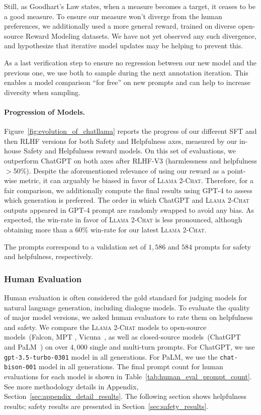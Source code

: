 Still, as Goodhart's Law states, when a measure becomes a target, it ceases to be a good measure. To ensure our measure won't diverge from the human preferences, we additionally used a more general reward, trained on diverse open-source Reward Modeling datasets. We have not yet observed any such divergence, and hypothesize that iterative model updates may be helping to prevent this. 

As a last verification step to ensure no regression between our new model and the previous one, we use both to sample during the next annotation iteration. This enables a model comparison ``for free'' on new prompts and can help to increase diversity when sampling.

\paragraph{Progression of Models.} Figure~\ref{fig:evolution_of_chatllama} reports the progress of our different SFT and then RLHF versions for both Safety and Helpfulness axes, measured by our in-house Safety and Helpfulness reward models. On this set of evaluations, we outperform ChatGPT on both axes after RLHF-V3 (harmlessness and helpfulness $>$50\%). Despite the aforementioned relevance of using our reward as a point-wise metric, it can arguably be biased in favor of \textsc{Llama 2-Chat}. Therefore, for a fair comparison, we additionally compute the final results using GPT-4 to assess which generation is preferred. The order in which ChatGPT and \textsc{Llama 2-Chat} outputs appeared in GPT-4 prompt are randomly swapped to avoid any bias. As expected, the win-rate in favor of \textsc{Llama 2-Chat} is less pronounced, although obtaining more than a 60\% win-rate for our latest \textsc{Llama 2-Chat}.

The prompts correspond to a validation set of $1,586$ and $584$ prompts for safety and helpfulness, respectively. 

\subsubsection{Human Evaluation}
\label{sec:detail_results}

Human evaluation is often considered the gold standard for judging models for natural language generation, including dialogue models. To evaluate the quality of major model versions, we asked human evaluators to rate them on helpfulness and safety. We compare the \textsc{Llama 2-Chat} models to open-source models~(Falcon, MPT \cite{MosaicML2023Introducing}, Vicuna~\cite{vicuna2023}, as well as closed-source models~(ChatGPT~\citep{openai2023gpt4} and PaLM~\cite{anil2023palm}) on over $4,000$ single and multi-turn prompts. For ChatGPT, we use \texttt{gpt-3.5-turbo-0301} model in all generations. For PaLM, we use the \texttt{chat-bison-001} model in all generations. The final prompt count for human evaluations for each model is shown in Table~\ref{tab:human_eval_prompt_count}. See more methodology details in Appendix, Section~\ref{sec:appendix_detail_results}. The following section shows helpfulness results; safety results are presented in Section~\ref{sec:safety_results}.

